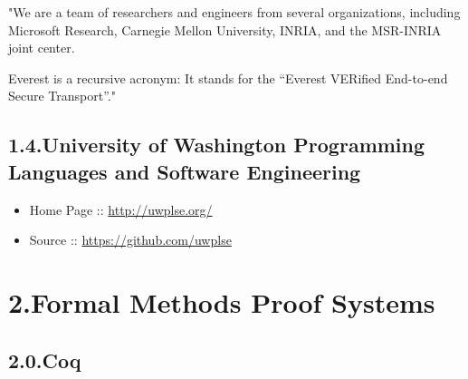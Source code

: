 \documentclass[12pt,twoside]{article}
\begin{document}
\noindent{}"We are a team of researchers and engineers from several
organizations, including Microsoft Research, Carnegie Mellon
University, INRIA, and the MSR-INRIA joint center.%

Everest is a recursive acronym: It stands for the “Everest VERified
End-to-end Secure Transport”."%

\subsection{1.4.\hspace*{0.5em}University of Washington Programming Languages and Software Engineering}\label{sec-university-of-washington-programming-languages-and-software-engineering}%

\begin{itemize}[noitemsep,topsep=\mdcompacttopsep]%

\item{}Home Page :: \href{http://uwplse.org/}{{\ttfamily http://\hspace{0pt}uwplse.\hspace{0pt}org/\hspace{0pt}}}%

\item{}Source :: \href{https://github.com/uwplse}{{\ttfamily https://\hspace{0pt}github.\hspace{0pt}com/\hspace{0pt}uwplse}}%
\end{itemize}%

\section{2.\hspace*{0.5em}Formal Methods Proof Systems}\label{sec-formal-methods-proof-systems}%

\subsection{2.0.\hspace*{0.5em}Coq}\label{sec-coq}%
\end{document}
